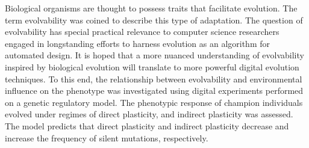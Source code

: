Biological organisms are thought to possess traits that facilitate evolution.
The term evolvability was coined to describe this type of adaptation.
The question of evolvability has special practical relevance to computer science researchers engaged in longstanding efforts to harness evolution as an algorithm for automated design.
It is hoped that a more nuanced understanding of evolvability inspired by biological evolution will translate to more powerful digital evolution techniques.
To this end, the relationship between evolvability and environmental influence on the phenotype was investigated using digital experiments performed on a genetic regulatory model.
The phenotypic response of champion individuals evolved under regimes of direct plasticity, and indirect plasticity was assessed.
The model predicts that direct plasticity and indirect plasticity decrease and increase the frequency of silent mutations, respectively.